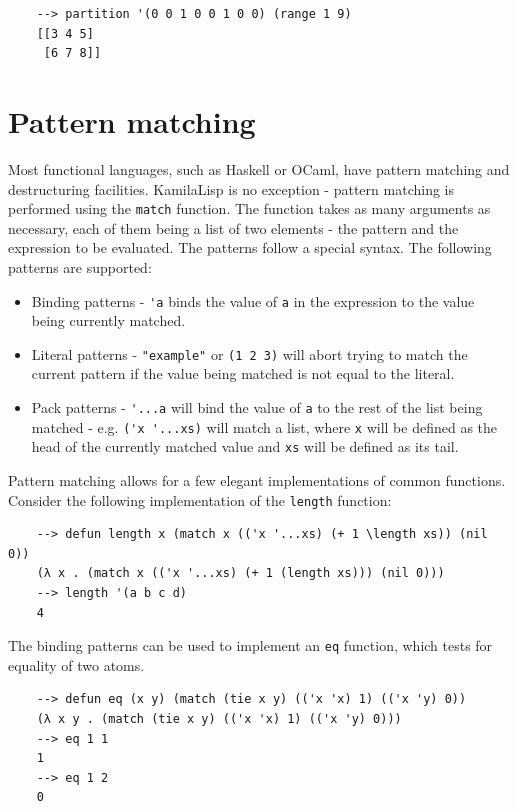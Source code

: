 \begin{Verbatim}
    --> partition '(0 0 1 0 0 1 0 0) (range 1 9)
    [[3 4 5]
     [6 7 8]]
\end{Verbatim}

\section{Pattern matching}

Most functional languages, such as Haskell or OCaml, have pattern matching and destructuring facilities. KamilaLisp is no exception - pattern matching is performed using the \verb|match| function. The function takes as many arguments as necessary, each of them being a list of two elements - the pattern and the expression to be evaluated. The patterns follow a special syntax. The following patterns are supported:

\begin{itemize}
    \item Binding patterns - \verb|'a| binds the value of \verb|a| in the expression to the value being currently matched.
    \item Literal patterns - \verb|"example"| or \verb|(1 2 3)| will abort trying to match the current pattern if the value being matched is not equal to the literal.
    \item Pack patterns - \verb|'...a| will bind the value of \verb|a| to the rest of the list being matched - e.g. \verb|('x '...xs)| will match a list, where \verb|x| will be defined as the head of the currently matched value and \verb|xs| will be defined as its tail.
\end{itemize}

Pattern matching allows for a few elegant implementations of common functions. Consider the following implementation of the \verb|length| function:

\begin{Verbatim}
    --> defun length x (match x (('x '...xs) (+ 1 \length xs)) (nil 0))
    (λ x . (match x (('x '...xs) (+ 1 (length xs))) (nil 0)))
    --> length '(a b c d)
    4
\end{Verbatim}

The binding patterns can be used to implement an \verb|eq| function, which tests for equality of two atoms.

\begin{Verbatim}
    --> defun eq (x y) (match (tie x y) (('x 'x) 1) (('x 'y) 0))
    (λ x y . (match (tie x y) (('x 'x) 1) (('x 'y) 0)))
    --> eq 1 1
    1
    --> eq 1 2
    0
\end{Verbatim}

